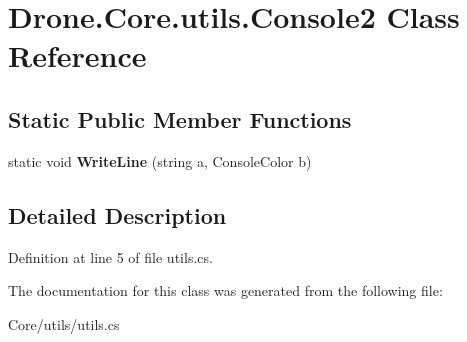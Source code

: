 \hypertarget{class_drone_1_1_core_1_1utils_1_1_console2}{}\section{Drone.\+Core.\+utils.\+Console2 Class Reference}
\label{class_drone_1_1_core_1_1utils_1_1_console2}
\subsection*{Static Public Member Functions}
\begin{DoxyCompactItemize}
\item 
\hypertarget{class_drone_1_1_core_1_1utils_1_1_console2_a79d03e01bfb84e8a46a4fe104817bcd5}{}static void {\bfseries Write\+Line} (string a, Console\+Color b)\label{class_drone_1_1_core_1_1utils_1_1_console2_a79d03e01bfb84e8a46a4fe104817bcd5}

\end{DoxyCompactItemize}


\subsection{Detailed Description}


Definition at line 5 of file utils.\+cs.



The documentation for this class was generated from the following file\+:\begin{DoxyCompactItemize}
\item 
Core/utils/utils.\+cs\end{DoxyCompactItemize}
